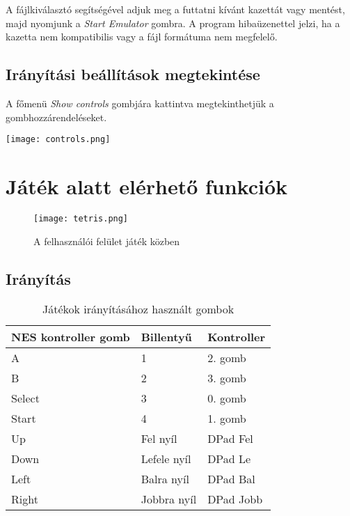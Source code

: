 A fájlkiválasztó segítségével adjuk meg a futtatni kívánt kazettát vagy mentést, majd nyomjunk a \emph{Start Emulator} gombra.
A program hibaüzenettel jelzi, ha a kazetta nem kompatibilis vagy a fájl formátuma nem megfelelő.

\subsection{Irányítási beállítások megtekintése}

A főmenü \emph{Show controls} gombjára kattintva megtekinthetjük a gombhozzárendeléseket.

\begin{center}
	\texttt{[image: controls.png]}
\end{center}

\section{Játék alatt elérhető funkciók}

\begin{figure}[H]
	\centering
	\texttt{[image: tetris.png]}
	\caption{A felhasználói felület játék közben}
\end{figure}

\subsection {Irányítás}

\begin{table}[H]
	\centering
	\begin{tabular}{ | l |  l | l | }
		\hline
		NES kontroller gomb & Billentyű & Kontroller \\
		\hline			
		A      & 1 & 2. gomb \\
		B      & 2 & 3. gomb \\
		Select & 3 & 0. gomb \\
		Start  & 4 & 1. gomb \\
		Up     & Fel nyíl & DPad Fel \\
		Down   & Lefele nyíl & DPad Le \\
		Left   & Balra nyíl & DPad Bal \\ 
		Right  & Jobbra nyíl & DPad Jobb \\
		\hline
	\end{tabular}
	\caption{Játékok irányításához használt gombok}
	\label{fig:btns}
\end{table}

